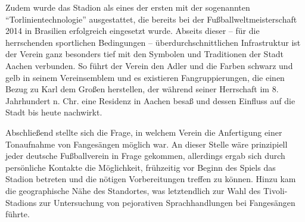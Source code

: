 Zudem wurde das Stadion als eines der ersten mit der sogenannten "`Torlinientechnologie"' ausgestattet, die bereits bei der Fußballweltmeisterschaft 2014 in Brasilien erfolgreich eingesetzt wurde.
Abseits dieser – für die herrschenden sportlichen Bedingungen – überdurchschnittlichen Infrastruktur ist der Verein ganz besonders tief mit den Symbolen und Traditionen der Stadt Aachen verbunden.
So führt der Verein den Adler und die Farben schwarz und gelb in seinem Vereinsemblem und es existieren Fangruppierungen, die einen Bezug zu Karl dem Großen herstellen, der während seiner Herrschaft im 8. Jahrhundert n. Chr. eine Residenz in Aachen besaß und dessen Einfluss auf die Stadt bis heute nachwirkt.

Abschließend stellte sich die Frage, in welchem Verein die Anfertigung einer Tonaufnahme von Fangesängen möglich war.
An dieser Stelle wäre prinzipiell jeder deutsche Fußballverein in Frage gekommen, allerdings ergab sich durch persönliche Kontakte die Möglichkeit, frühzeitig vor Beginn des Spiels das Stadion betreten und die nötigen Vorbereitungen treffen zu können.
Hinzu kam die geographische Nähe des Standortes, was letztendlich zur Wahl des Tivoli-Stadions zur Untersuchung von pejorativen Sprachhandlungen bei Fangesängen führte.
